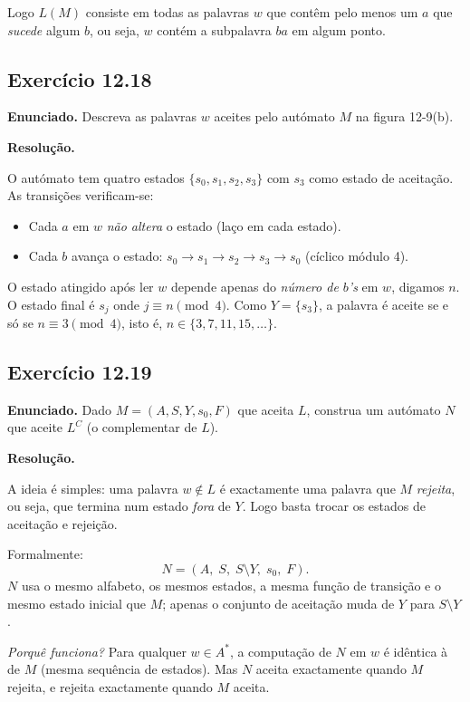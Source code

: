 \documentclass[12pt,a4paper]{article}
\begin{document}
Logo $L(M)$ consiste em todas as palavras $w$ que contêm pelo menos um $a$ que \emph{sucede}
algum $b$, ou seja, $w$ contém a subpalavra $ba$ em algum ponto.

\subsection*{Exercício 12.18}

\textbf{Enunciado.} Descreva as palavras $w$ aceites pelo autómato $M$ na figura 12-9(b).

\medskip
\textbf{Resolução.}

O autómato tem quatro estados $\{s_0, s_1, s_2, s_3\}$ com $s_3$ como estado de aceitação.
As transições verificam-se:
\begin{itemize}
  \item Cada $a$ em $w$ \emph{não altera} o estado (laço em cada estado).
  \item Cada $b$ avança o estado: $s_0 \to s_1 \to s_2 \to s_3 \to s_0$ (cíclico módulo 4).
\end{itemize}

O estado atingido após ler $w$ depende apenas do \emph{número de $b$'s} em $w$,
digamos $n$. O estado final é $s_j$ onde $j \equiv n \pmod{4}$.
Como $Y = \{s_3\}$, a palavra é aceite se e só se $n \equiv 3 \pmod{4}$,
isto é, $n \in \{3, 7, 11, 15, \ldots\}$.

\subsection*{Exercício 12.19}

\textbf{Enunciado.} Dado $M = (A, S, Y, s_0, F)$ que aceita $L$, construa um autómato
$N$ que aceite $L^C$ (o complementar de $L$).

\medskip
\textbf{Resolução.}

A ideia é simples: uma palavra $w \notin L$ é exactamente uma palavra que $M$ \emph{rejeita},
ou seja, que termina num estado \emph{fora} de $Y$. Logo basta trocar os estados de
aceitação e rejeição.

Formalmente:
\[
  N = (A,\; S,\; S \setminus Y,\; s_0,\; F).
\]
$N$ usa o mesmo alfabeto, os mesmos estados, a mesma função de transição e o mesmo estado
inicial que $M$; apenas o conjunto de aceitação muda de $Y$ para $S \setminus Y$.

\medskip
\noindent\textit{Porquê funciona?} Para qualquer $w \in A^*$, a computação de $N$ em
$w$ é idêntica à de $M$ (mesma sequência de estados). Mas $N$ aceita exactamente quando
$M$ rejeita, e rejeita exactamente quando $M$ aceita.
\end{document}
